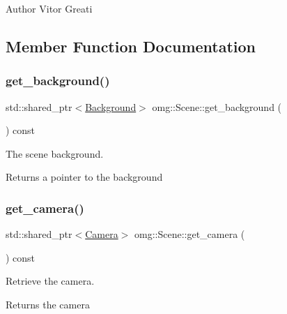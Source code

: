 \begin{DoxyAuthor}{Author}
Vitor Greati 
\end{DoxyAuthor}


\subsection{Member Function Documentation}
\mbox{\label{classomg_1_1_scene_a2eef3b62d9d01b19fb32751942f1fa7c}} 
\subsubsection{\texorpdfstring{get\_background()}{get\_background()}}
{\footnotesize\ttfamily std\+::shared\+\_\+ptr$<$\mbox{\hyperlink{classomg_1_1_background}{Background}}$>$ omg\+::\+Scene\+::get\+\_\+background (\begin{DoxyParamCaption}{ }\end{DoxyParamCaption}) const\hspace{0.3cm}{\ttfamily [inline]}}



The scene background. 

\begin{DoxyReturn}{Returns}
a pointer to the background 
\end{DoxyReturn}
\mbox{\label{classomg_1_1_scene_a7f9aac9cd9ea4d984ac2df98ae553967}} 
\subsubsection{\texorpdfstring{get\_camera()}{get\_camera()}}
{\footnotesize\ttfamily std\+::shared\+\_\+ptr$<$\mbox{\hyperlink{classomg_1_1_camera}{Camera}}$>$ omg\+::\+Scene\+::get\+\_\+camera (\begin{DoxyParamCaption}{ }\end{DoxyParamCaption}) const\hspace{0.3cm}{\ttfamily [inline]}}



Retrieve the camera. 

\begin{DoxyReturn}{Returns}
the camera 
\end{DoxyReturn}
\mbox{\label{classomg_1_1_scene_a66a4d47f99b8cf56d0ffeec665400d56}} 
